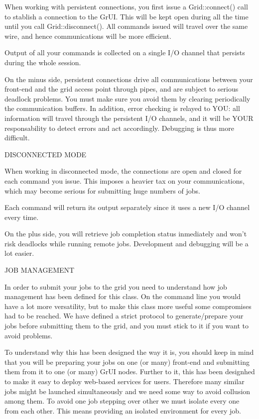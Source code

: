 When working with persistent connections, you first issue a Grid::connect() call to stablish a connection to the Gr\-UI. This will be kept open during all the time until you call Grid::disconnect(). All commands issued will travel over the same wire, and hence communications will be more efficient.

Output of all your commands is collected on a single I/O channel that persists during the whole session.

On the minus side, persistent connections drive all communications between your front-end and the grid access point through pipes, and are subject to serious deadlock problems. You must make sure you avoid them by clearing periodically the communication buffers. In addition, error checking is relayed to YOU: all information will travel through the persistent I/O channels, and it will be YOUR responsability to detect errors and act accordingly. Debugging is thus more difficult.

DISCONNECTED MODE

When working in disconnected mode, the connections are open and closed for each command you issue. This imposes a heavier tax on your communications, which may become serious for submitting huge numbers of jobs.

Each command will return its output separately since it uses a new I/O channel every time.

On the plus side, you will retrieve job completion status inmediately and won't risk deadlocks while running remote jobs. Development and debugging will be a lot easier.

JOB MANAGEMENT

In order to submit your jobs to the grid you need to understand how job management has been defined for this class. On the command line you would have a lot more versatility, but to make this class more useful some compromises had to be reached. We have defined a strict protocol to generate/prepare your jobs before submitting them to the grid, and you must stick to it if you want to avoid problems.

To understand why this has been designed the way it is, you should keep in mind that you will be preparing your jobs on one (or many) front-end and submitting them from it to one (or many) Gr\-UI nodes. Further to it, this has been designhed to make it easy to deploy web-based services for users. Therefore many similar jobs might be launched simultaneously and we need some way to avoid collusion among them. To avoid one job stepping over other we must isolate every one from each other. This means providing an isolated environment for every job.

